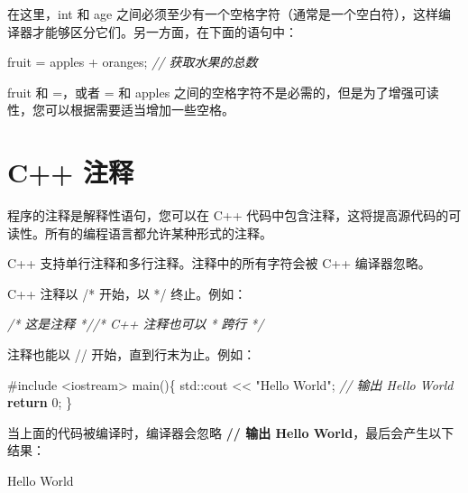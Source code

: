 \documentclass[
]{article}
\newenvironment{Shaded}{}{}
\newcommand{\BuiltInTok}[1]{#1}
\newcommand{\CommentTok}[1]{\textcolor[rgb]{0.38,0.63,0.69}{\textit{#1}}}
\newcommand{\ControlFlowTok}[1]{\textcolor[rgb]{0.00,0.44,0.13}{\textbf{#1}}}
\newcommand{\DecValTok}[1]{\textcolor[rgb]{0.25,0.63,0.44}{#1}}
\newcommand{\ImportTok}[1]{#1}
\newcommand{\NormalTok}[1]{#1}
\newcommand{\OperatorTok}[1]{\textcolor[rgb]{0.40,0.40,0.40}{#1}}
\newcommand{\PreprocessorTok}[1]{\textcolor[rgb]{0.74,0.48,0.00}{#1}}
\newcommand{\StringTok}[1]{\textcolor[rgb]{0.25,0.44,0.63}{#1}}
\begin{document}
在这里，int 和 age
之间必须至少有一个空格字符（通常是一个空白符），这样编译器才能够区分它们。另一方面，在下面的语句中：

\begin{Shaded}
\begin{Highlighting}[]
\NormalTok{fruit }\OperatorTok{=}\NormalTok{ apples }\OperatorTok{+}\NormalTok{ oranges}\OperatorTok{;}   \CommentTok{// 获取水果的总数}
\end{Highlighting}
\end{Shaded}

fruit 和 =，或者 = 和 apples
之间的空格字符不是必需的，但是为了增强可读性，您可以根据需要适当增加一些空格。

\hypertarget{c-ux6ce8ux91ca}{%
\section{C++ 注释}\label{c-ux6ce8ux91ca}}

程序的注释是解释性语句，您可以在 C++
代码中包含注释，这将提高源代码的可读性。所有的编程语言都允许某种形式的注释。

C++ 支持单行注释和多行注释。注释中的所有字符会被 C++ 编译器忽略。

C++ 注释以 /* 开始，以 */ 终止。例如：

\begin{Shaded}
\begin{Highlighting}[]
\CommentTok{/* 这是注释 *//* C++ 注释也可以}
\CommentTok{ * 跨行}
\CommentTok{ */}
\end{Highlighting}
\end{Shaded}

注释也能以 // 开始，直到行末为止。例如：

\begin{Shaded}
\begin{Highlighting}[]
\PreprocessorTok{\#include }\ImportTok{\textless{}iostream\textgreater{}}
\NormalTok{main}\OperatorTok{()\{}
   \BuiltInTok{std::}\NormalTok{cout}\OperatorTok{ \textless{}\textless{}} \StringTok{"Hello World"}\OperatorTok{;} \CommentTok{// 输出 Hello World}
   \ControlFlowTok{return} \DecValTok{0}\OperatorTok{;}
\OperatorTok{\}}
\end{Highlighting}
\end{Shaded}

当上面的代码被编译时，编译器会忽略 \textbf{// 输出 Hello
World}，最后会产生以下结果：

\begin{Shaded}
\begin{Highlighting}[]
\NormalTok{Hello World}
\end{Highlighting}
\end{Shaded}
\end{document}
